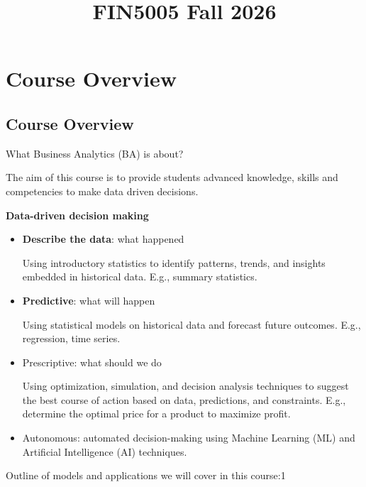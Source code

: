\documentclass[
  12pt,
  a4paper,
]{scrbook}
\title{FIN5005 Fall 2026}
\author{}
\date{}
\renewcommand*\contentsname{Table of contents}
\newcommand\contentsname{Table of contents}
\theoremstyle{plain}
\theoremstyle{definition}
\theoremstyle{remark}
\begin{document}
\frontmatter
\maketitle

\renewcommand*\contentsname{Table of contents}
{
\setcounter{tocdepth}{2}
\tableofcontents
}

\mainmatter
\chapter{Course Overview}\label{course-overview}

\section{Course Overview}\label{course-overview-1}

What Business Analytics (BA) is about?

The aim of this course is to provide students advanced knowledge, skills
and competencies to make data driven decisions.

\textbf{Data-driven decision making}

\begin{itemize}
\item
  \textbf{Describe the data}: what happened

  Using introductory statistics to identify patterns, trends, and
  insights embedded in historical data. E.g., summary statistics.
\item
  \textbf{Predictive}: what will happen

  Using statistical models on historical data and forecast future
  outcomes. E.g., regression, time series.
\item
  Prescriptive: what should we do

  Using optimization, simulation, and decision analysis techniques to
  suggest the best course of action based on data, predictions, and
  constraints. E.g., determine the optimal price for a product to
  maximize profit.
\item
  Autonomous: automated decision-making using Machine Learning (ML) and
  Artificial Intelligence (AI) techniques.
\end{itemize}

Outline of models and applications we will cover in this course:1

\end{document}
